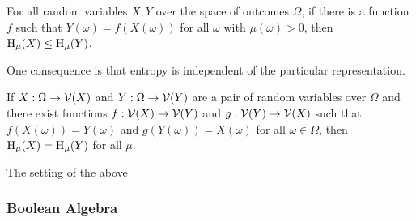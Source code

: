 \documentclass{article}
\begin{document}
    \begin{fact}
        For all random variables $X,Y$ over the space of outcomes $\Omega$, if there is a function $f$ such that $Y(\omega) = f(X(\omega))$ for all $\omega$ with $\mu(\omega) > 0$, then $\operatorname{\mathrm{H}}_\mu(X) \leq \operatorname{\mathrm{H}}_\mu(Y)$.
    \end{fact}
    One consequence is that entropy is independent of the particular representation.
    \begin{prop}
        If $X : \Omega \to \mathcal V(X)$ and $Y : \Omega \to \mathcal V(Y)$ are a pair of random variables over $\Omega$ and there exist functions $f : \mathcal V(X) \to \mathcal V(Y)$ and $g : \mathcal V(Y) \to \mathcal V(X)$ such that $f(X(\omega)) = Y(\omega)$ and $g(Y(\omega)) = X(\omega)$ for all $\omega \in \Omega$, then $\operatorname{\mathrm{H}}_\mu(X) = \operatorname{\mathrm{H}}_\mu(Y)$ for all $\mu$.
    \end{prop}

    The setting of the above
    \begin{center}
    \end{center}

    \subsubsection{Boolean Algebra}
\end{document}
